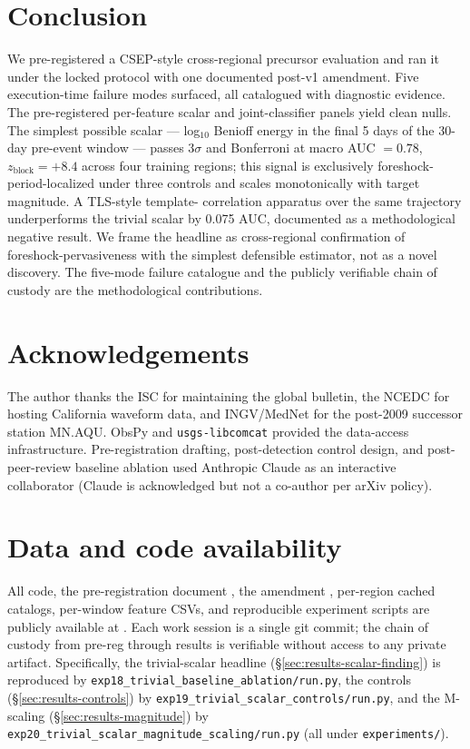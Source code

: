 \documentclass[11pt]{article}
\begin{document}
\section{Conclusion}
\label{sec:conclusion}

We pre-registered a CSEP-style cross-regional precursor evaluation and
ran it under the locked protocol with one documented post-v1
amendment. Five execution-time failure modes surfaced, all catalogued
with diagnostic evidence. The pre-registered per-feature scalar and
joint-classifier panels yield clean nulls. The simplest possible
scalar — log$_{10}$ Benioff energy in the final 5 days of the 30-day
pre-event window — passes 3$\sigma$ and Bonferroni at macro AUC $=
0.78$, $z_\mathrm{block} = +8.4$ across four training regions; this
signal is exclusively foreshock-period-localized under three controls
and scales monotonically with target magnitude. A TLS-style template-
correlation apparatus over the same trajectory underperforms the
trivial scalar by 0.075 AUC, documented as a methodological negative
result. We frame the headline as cross-regional confirmation of
\citet{trugman2019} foreshock-pervasiveness with the simplest
defensible estimator, not as a novel discovery. The five-mode
failure catalogue and the publicly verifiable chain of custody are the
methodological contributions.

\section*{Acknowledgements}
The author thanks the ISC for maintaining the global bulletin, the
NCEDC for hosting California waveform data, and INGV/MedNet for the
post-2009 successor station MN.AQU. ObsPy \citep{beyreuther2010} and
\texttt{usgs-libcomcat} provided the data-access infrastructure.
Pre-registration drafting, post-detection control design, and post-
peer-review baseline ablation used Anthropic Claude as an interactive
collaborator (Claude is acknowledged but not a co-author per arXiv
policy).

\section*{Data and code availability}
\begin{sloppypar}
All code, the pre-registration document \citep{loftus2026prereg}, the
amendment \citep{loftus2026pra2}, per-region cached catalogs, per-window
feature CSVs, and reproducible experiment scripts are publicly available
at \citet{loftus2026repo}. Each work session is a single git commit; the
chain of custody from pre-reg through results is verifiable without
access to any private artifact. Specifically, the trivial-scalar
headline (\S\ref{sec:results-scalar-finding}) is reproduced by
\texttt{exp18\_trivial\_baseline\_ablation/run.py}, the controls
(\S\ref{sec:results-controls}) by
\texttt{exp19\_trivial\_scalar\_controls/run.py}, and the M-scaling
(\S\ref{sec:results-magnitude}) by
\texttt{exp20\_trivial\_scalar\_magnitude\_scaling/run.py} (all under
\texttt{experiments/}).
\end{sloppypar}


\end{document}
